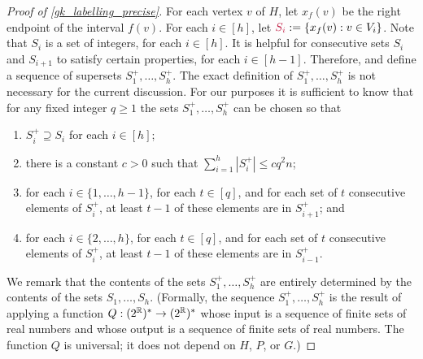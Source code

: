 \documentclass{patmorin}
\makeatletter
\renewcommand{\ge}{\geqslant}
\renewcommand{\le}{\leqslant}
\newcommand{\defin}[1]{\emph{\textcolor{brightmaroon}{#1}}}
\def\mathcolor#1#{\@mathcolor{#1}}
\def\@mathcolor#1#2#3{%
  \protect\leavevmode
  \begingroup
    \color#1{#2}#3%
  \endgroup
}
\newcommand{\mathdefin}[1]{\mathcolor{brightmaroon}{#1}}
\makeatother
\begin{document}
\begin{proof}[Proof of \cref{gk_labelling_precise}]
  For each vertex $v$ of $H$, let \defin{$x_f(v)$} be the right endpoint of the interval $f(v)$.
  For each $i\in[h]$, let $\mathdefin{S_i}:=\{x_f(v):v\in V_i\}$.
  Note that $S_i$ is a set of integers, for each $i\in[h]$.
  It is helpful for consecutive sets $S_i$ and $S_{i+1}$ to satisfy certain properties, for each $i\in[h-1]$. Therefore, \citet{dujmovic.esperet.ea:adjacency} and \citet{gawrychowski.janczewski:simpler} define a sequence of supersets \defin{$S^+_1,\ldots,S^+_h$}. The exact definition of $S^+_1,\ldots,S^+_h$ is not necessary for the current discussion.
  For our purposes it is sufficient to know that for any fixed integer $q\ge 1$ the sets $S^+_1,\ldots,S^+_h$ can be chosen so that  
  \begin{enumerate}[nosep,label=(\alph*)]
    \item\label{plus_superset} $S^+_i\supseteq S_i$ for each $i\in[h]$;
    \item\label{plus_size} there is a constant $c>0$ such that $\sum_{i=1}^h |S^+_i|\le cq^2n$;
    \item\label{plus_chunking_down} for each $i\in\{1,\ldots,h-1\}$, for each $t\in[q]$, and for each set of $t$ consecutive elements of  $S^+_i$, at least $t-1$ of these elements are in $S^+_{i+1}$; and 
    \item\label{plus_chunking_up} for each $i\in\{2,\ldots,h\}$, for each $t\in[q]$, and for each set of $t$ consecutive elements of $S^+_i$, at least $t-1$ of these elements are in $S^+_{i-1}$.     
  \end{enumerate}
  We remark that the contents of the sets $S^+_1,\ldots,S^+_h$ are entirely determined by the contents of the sets $S_1,\ldots,S_h$.
  (Formally, the sequence $S^+_1,\ldots,S^+_h$ is the result of applying a function $Q:(2^{\mathbb{R}})^*\to (2^{\mathbb{R}})^*$ whose input is a sequence of finite sets of real numbers and whose output is a sequence of finite sets of real numbers. The function $Q$ is universal; it does not depend on $H$, $P$, or $G$.)


\end{proof}
\end{document}
